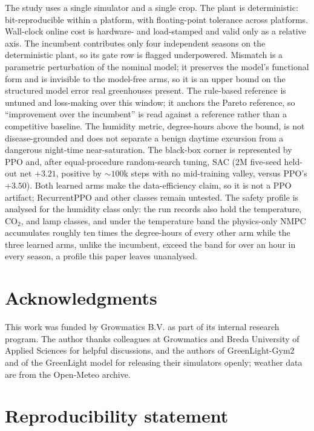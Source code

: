 \documentclass[11pt]{article}
\begin{document}
The study uses a single simulator and a single crop. The plant is deterministic: bit-reproducible within a platform, with floating-point tolerance across platforms. Wall-clock online cost is hardware- and load-stamped and valid only as a relative axis. The incumbent contributes only four independent seasons on the deterministic plant, so its gate row is flagged underpowered. Mismatch is a parametric perturbation of the nominal model; it preserves the model's functional form and is invisible to the model-free arms, so it is an upper bound on the structured model error real greenhouses present. The rule-based reference is untuned and loss-making over this window; it anchors the Pareto reference, so ``improvement over the incumbent'' is read against a reference rather than a competitive baseline. The humidity metric, degree-hours above the bound, is not disease-grounded and does not separate a benign daytime excursion from a dangerous night-time near-saturation. The black-box corner is represented by PPO and, after equal-procedure random-search tuning, SAC (2M five-seed held-out net $+3.21$, positive by ${\sim}100$k steps with no mid-training valley, versus PPO's $+3.50$). Both learned arms make the data-efficiency claim, so it is not a PPO artifact; RecurrentPPO and other classes remain untested. The safety profile is analysed for the humidity class only: the run records also hold the temperature, CO$_2$, and lamp classes, and under the temperature band the physics-only NMPC accumulates roughly ten times the degree-hours of every other arm while the three learned arms, unlike the incumbent, exceed the band for over an hour in every season, a profile this paper leaves unanalysed.

\section*{Acknowledgments}

This work was funded by Growmatics B.V. as part of its internal research program. The author thanks colleagues at Growmatics and Breda University of Applied Sciences for helpful discussions, and the authors of GreenLight-Gym2 and of the GreenLight model for releasing their simulators openly; weather data are from the Open-Meteo archive.

\section*{Reproducibility statement}
\end{document}
